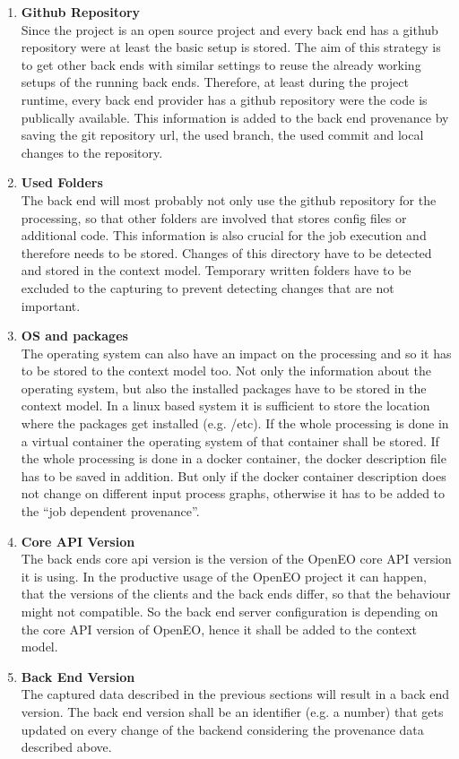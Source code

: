 \documentclass[draft,final]{vutinfth} %
\begin{document}
\begin{enumerate}
	\item \textbf{Github Repository} \\
	Since the project is an open source project and every back end has a github repository were at least the basic setup is stored. The aim of this strategy is to get other back ends with similar settings to reuse the already working setups of the running back ends.  Therefore, at least during the project runtime, every back end provider has a github repository were the code is publically available. This information is added to the back end provenance by saving the git repository url, the used branch, the used commit and local changes to the repository.
	\item\textbf{Used Folders} \\
	The back end will most probably not only use the github repository for the processing, so that other folders are involved that stores config files or additional code. This information is also crucial for the job execution and therefore needs to be stored. Changes of this directory have to be detected and stored in the context model. Temporary written folders have to be excluded to the capturing to prevent detecting changes that are not important. 
	\item \textbf{OS and packages} \\
	The operating system can also have an impact on the processing and so it has to be stored to the context model too. Not only the information about the operating system, but also the installed packages have to be stored in the context model. In a linux based system it is sufficient to store the location where the packages get installed (e.g. /etc). If the whole processing is done in a virtual container the operating system of that container shall be stored. If the whole processing is done in a docker container, the docker description file has to be saved in addition. But only if the docker container description does not change on different input process graphs, otherwise it has to be added to the “job dependent provenance”. 
	\item \textbf{Core API Version} \\
	The back ends core api version is the version of the OpenEO core API version it is using. In the productive usage of the OpenEO project it can happen, that the versions of the clients and the back ends differ, so that the behaviour might not compatible. So the back end server configuration is depending on the core API version of OpenEO, hence it shall be added to the context model. 
	\item \textbf{Back End Version} \\
	The captured data described in the previous sections will result in a back end version. The back end version shall be an identifier (e.g. a number) that gets updated on every change of the backend considering the provenance data described above. 
	

\end{enumerate}
\end{document}
